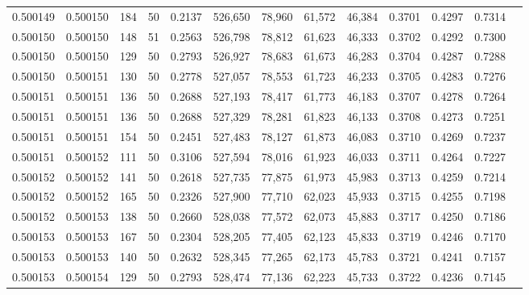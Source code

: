 \begin{tabular}{rrrrrrrrrrrrr}
0.500149 & 0.500150 &   184 &  50 &                                     0.2137 & 526,650 &  78,960 &  61,572 &  46,384 & 0.3701 & 0.4297 & 0.7314 \\
0.500150 & 0.500150 &   148 &  51 &                                     0.2563 & 526,798 &  78,812 &  61,623 &  46,333 & 0.3702 & 0.4292 & 0.7300 \\
0.500150 & 0.500150 &   129 &  50 &                                     0.2793 & 526,927 &  78,683 &  61,673 &  46,283 & 0.3704 & 0.4287 & 0.7288 \\
0.500150 & 0.500151 &   130 &  50 &                                     0.2778 & 527,057 &  78,553 &  61,723 &  46,233 & 0.3705 & 0.4283 & 0.7276 \\
0.500151 & 0.500151 &   136 &  50 &                                     0.2688 & 527,193 &  78,417 &  61,773 &  46,183 & 0.3707 & 0.4278 & 0.7264 \\
0.500151 & 0.500151 &   136 &  50 &                                     0.2688 & 527,329 &  78,281 &  61,823 &  46,133 & 0.3708 & 0.4273 & 0.7251 \\
0.500151 & 0.500151 &   154 &  50 &                                     0.2451 & 527,483 &  78,127 &  61,873 &  46,083 & 0.3710 & 0.4269 & 0.7237 \\
0.500151 & 0.500152 &   111 &  50 &                                     0.3106 & 527,594 &  78,016 &  61,923 &  46,033 & 0.3711 & 0.4264 & 0.7227 \\
0.500152 & 0.500152 &   141 &  50 &                                     0.2618 & 527,735 &  77,875 &  61,973 &  45,983 & 0.3713 & 0.4259 & 0.7214 \\
0.500152 & 0.500152 &   165 &  50 &                                     0.2326 & 527,900 &  77,710 &  62,023 &  45,933 & 0.3715 & 0.4255 & 0.7198 \\
0.500152 & 0.500153 &   138 &  50 &                                     0.2660 & 528,038 &  77,572 &  62,073 &  45,883 & 0.3717 & 0.4250 & 0.7186 \\
0.500153 & 0.500153 &   167 &  50 &                                     0.2304 & 528,205 &  77,405 &  62,123 &  45,833 & 0.3719 & 0.4246 & 0.7170 \\
0.500153 & 0.500153 &   140 &  50 &                                     0.2632 & 528,345 &  77,265 &  62,173 &  45,783 & 0.3721 & 0.4241 & 0.7157 \\
0.500153 & 0.500154 &   129 &  50 &                                     0.2793 & 528,474 &  77,136 &  62,223 &  45,733 & 0.3722 & 0.4236 & 0.7145 \\

\end{tabular}
